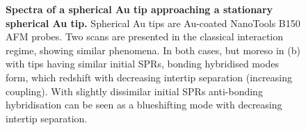 \documentclass[a4paper]{article}
\begin{document}
\begin{figure}
\centering
{}
\caption[Spectra of a spherical Au tip approaching a stationary spherical Au tip]{\textbf{Spectra of a spherical Au tip approaching a stationary spherical Au tip.} Spherical Au tips are Au-coated NanoTools B150 AFM probes. Two scans are presented in the classical interaction regime, showing similar phenomena. In both cases, but moreso in (b) with tips having similar initial SPRs, bonding hybridised modes form, which redshift with decreasing intertip separation (increasing coupling). With slightly dissimilar initial SPRs anti-bonding hybridisation can be seen as a blueshifting mode with decreasing intertip separation.}
\label{fig:spherical_tip_dimer_scan}
\end{figure}
\end{document}
